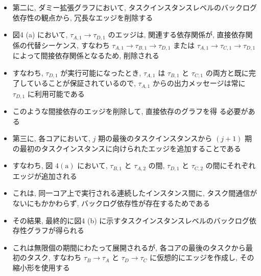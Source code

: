 \begin{frame}{}
    \begin{itemize}
        \item 第二に, ダミー拡張グラフにおいて, タスクインスタンスレベルのバックログ依存性の観点から, 冗長なエッジを削除する
\item 図4 (a) において, $\tau_{A, 1} \rightarrow \tau_{D, 1}$ のエッジは, 関連する依存関係が, 直接依存関係の代替シーケンス, すなわち $\tau_{A, 1} \rightarrow \tau_{B, 1} \rightarrow \tau_{D, 1}$ または $\tau_{A, 1} \rightarrow \tau_{C, 1} \rightarrow \tau_{D, 1}$ によって間接依存関係となるため, 削除される
\item すなわち, $\tau_{D, 1}$ が実行可能になったとき, $\tau_{A, 1}$ は $\tau_{B, 1}$ と $\tau_{C, 1}$ の両方と既に完了していることが保証されているので, $\tau_{A, 1}$ からの出力メッセージは常に $\tau_{D, 1}$ に利用可能である
\item このような間接依存のエッジを削除して, 直接依存のグラフを得 る必要がある
    \end{itemize}
\end{frame}

\begin{frame}{}
    \begin{itemize}
        \item 第三に, 各コアにおいて, $j$ 期の最後のタスクインスタンスから $(j+1)$ 期の最初のタスクインスタンスに向けられたエッジを追加することである
\item すなわち, 図 $4(\mathrm{a})$ において, $\tau_{B, 1}$ と $\tau_{A, 2}$ の間, $\tau_{D, 1}$ と $\tau_{C, 2}$ の間にそれぞれエッジが追加される
\item これは, 同一コア上で実行される連続したインスタンス間に, タスク間通信がないにもかかわらず, バックログ依存性が存在するためである
    \end{itemize}
\end{frame}

\begin{frame}{}
    \begin{itemize}
        \item その結果, 最終的に図4 (b) に示すタスクインスタンスレベルのバックログ依存性グラフが得られる
\item これは無限個の期間にわたって展開されるが, 各コアの最後のタスクから最初のタスク, すなわち $\tau_{B} \rightarrow \tau_{A}$ と $\tau_{D} \rightarrow \tau_{C}$ に仮想的にエッジを作成し, その縮小形を使用する
    \end{itemize}
\end{frame}

